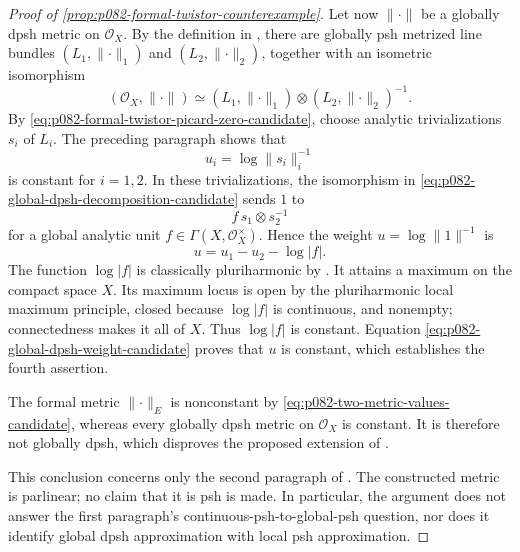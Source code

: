\begin{proof}[Proof of
\cref{prop:p082-formal-twistor-counterexample}]
Let now $\lVert\cdot\rVert$ be a globally dpsh metric on
$\mathcal O_X$.  By the definition in \cite[\S17.8.5]{CLD25}, there are
globally psh metrized line bundles
$(L_1,\lVert\cdot\rVert_1)$ and
$(L_2,\lVert\cdot\rVert_2)$, together with an isometric isomorphism
\begin{equation}\label{eq:p082-global-dpsh-decomposition-candidate}
  (\mathcal O_X,\lVert\cdot\rVert)
       \simeq
  (L_1,\lVert\cdot\rVert_1)
       \otimes (L_2,\lVert\cdot\rVert_2)^{-1}.
\end{equation}
By \eqref{eq:p082-formal-twistor-picard-zero-candidate}, choose analytic
trivializations $s_i$ of $L_i$.  The preceding paragraph shows that
\[
                        u_i=\log\lVert s_i\rVert_i^{-1}
\]
is constant for $i=1,2$.  In these trivializations, the isomorphism in
\eqref{eq:p082-global-dpsh-decomposition-candidate} sends $1$ to
\[
                         f\,s_1\otimes s_2^{-1}
\]
for a global analytic unit
$f\in\Gamma(X,\mathcal O_X^\times)$.  Hence the weight
$u=\log\lVert1\rVert^{-1}$ is
\begin{equation}\label{eq:p082-global-dpsh-weight-candidate}
                         u=u_1-u_2-\log|f|.
\end{equation}
The function $\log|f|$ is classically pluriharmonic by
\cite[Proposition~7.2(2)]{GR25Classical}.  It attains a maximum on the
compact space $X$.  Its maximum locus is open by the pluriharmonic local
maximum principle, closed because $\log|f|$ is continuous, and nonempty;
connectedness makes
it all of $X$.  Thus $\log|f|$ is constant.  Equation
\eqref{eq:p082-global-dpsh-weight-candidate} proves that $u$ is constant,
which establishes the fourth assertion.

The formal metric $\lVert\cdot\rVert_E$ is nonconstant by
\eqref{eq:p082-two-metric-values-candidate}, whereas every globally dpsh
metric on $\mathcal O_X$ is constant.  It is therefore not globally
dpsh, which disproves the proposed extension of
\cite[Corollary~17.8.9]{CLD25}.

This conclusion concerns only the second paragraph of
\cite[Remark~17.8.10]{CLD25}.  The constructed metric is parlinear; no
claim that it is psh is made.  In particular, the argument does not answer
the first paragraph's continuous-psh-to-global-psh question, nor does it
identify global dpsh approximation with local psh approximation.
\end{proof}
